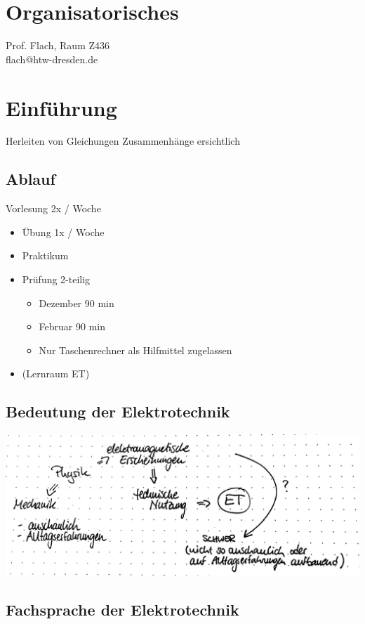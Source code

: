 \section{Organisatorisches}

Prof. Flach, Raum Z436\\
flach@htw-dresden.de

\section{Einführung}

Herleiten von Gleichungen \Ra Zusammenhänge ersichtlich

\subsection{Ablauf}

Vorlesung 2x / Woche
\begin{itemize}
	\item Übung 1x / Woche
	\item Praktikum
	\item Prüfung 2-teilig
	\begin{itemize}
		\item Dezember 90 min
		\item Februar 90 min
		\item Nur Taschenrechner als Hilfmittel zugelassen
	\end{itemize}
	\item (Lernraum ET)
\end{itemize}

\subsection{Bedeutung der Elektrotechnik}

\includegraphics[width=\textwidth]{img/1_1}

\subsection{Fachsprache der Elektrotechnik}

